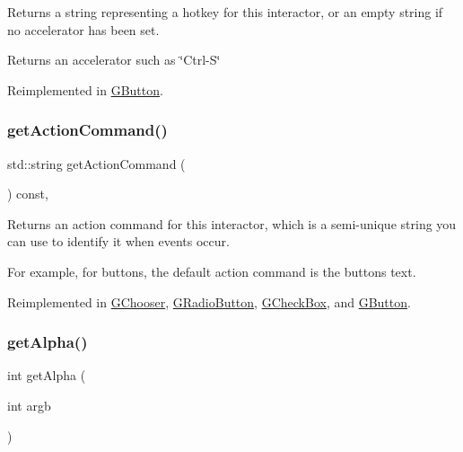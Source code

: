Returns a string representing a hotkey for this interactor, or an empty string if no accelerator has been set. 

\begin{DoxyReturn}{Returns}
an accelerator such as \char`\"{}\+Ctrl-\/\+S\char`\"{} 
\end{DoxyReturn}


Reimplemented in \mbox{\hyperlink{classGButton_a432ca43c59ffb2adc9cb66d43621bc27}{G\+Button}}.

\mbox{\label{classGInteractor_a94eb4276000c4fdfb508ce9e6317a82a}} 
\subsubsection{\texorpdfstring{get\+Action\+Command()}{getActionCommand()}}
{\footnotesize\ttfamily std\+::string get\+Action\+Command (\begin{DoxyParamCaption}{ }\end{DoxyParamCaption}) const\hspace{0.3cm}{\ttfamily [virtual]}, {\ttfamily [inherited]}}



Returns an action command for this interactor, which is a semi-\/unique string you can use to identify it when events occur. 

For example, for buttons, the default action command is the button\textquotesingle{}s text. 

Reimplemented in \mbox{\hyperlink{classGChooser_a90f2b1e6f6e7dabd9d6e5307f7c6d1b7}{G\+Chooser}}, \mbox{\hyperlink{classGRadioButton_a90f2b1e6f6e7dabd9d6e5307f7c6d1b7}{G\+Radio\+Button}}, \mbox{\hyperlink{classGCheckBox_a90f2b1e6f6e7dabd9d6e5307f7c6d1b7}{G\+Check\+Box}}, and \mbox{\hyperlink{classGButton_a90f2b1e6f6e7dabd9d6e5307f7c6d1b7}{G\+Button}}.

\mbox{\label{classGCanvas_a48d898ddf58651669b5f33240a65096f}} 
\subsubsection{\texorpdfstring{get\+Alpha()}{getAlpha()}}
{\footnotesize\ttfamily int get\+Alpha (\begin{DoxyParamCaption}\item[{int}]{argb }\end{DoxyParamCaption})\hspace{0.3cm}{\ttfamily [static]}}



